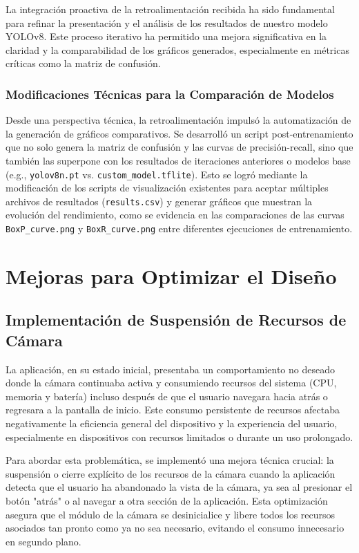 \documentclass[10pt,a4paper]{report}
\begin{document}
La integración proactiva de la retroalimentación recibida ha sido fundamental para refinar la presentación y el análisis de los resultados de nuestro modelo YOLOv8. Este proceso iterativo ha permitido una mejora significativa en la claridad y la comparabilidad de los gráficos generados, especialmente en métricas críticas como la matriz de confusión.



\subsection{Modificaciones Técnicas para la Comparación de Modelos}
Desde una perspectiva técnica, la retroalimentación impulsó la automatización de la generación de gráficos comparativos. Se desarrolló un script post-entrenamiento que no solo genera la matriz de confusión y las curvas de precisión-recall, sino que también las superpone con los resultados de iteraciones anteriores o modelos base (e.g., \texttt{yolov8n.pt} vs. \texttt{custom\_model.tflite}). Esto se logró mediante la modificación de los scripts de visualización existentes para aceptar múltiples archivos de resultados (\texttt{results.csv}) y generar gráficos que muestran la evolución del rendimiento, como se evidencia en las comparaciones de las curvas \texttt{BoxP\_curve.png} y \texttt{BoxR\_curve.png} entre diferentes ejecuciones de entrenamiento.




\chapter{Mejoras para Optimizar el Diseño}

\section{Implementación de Suspensión de Recursos de Cámara}
La aplicación, en su estado inicial, presentaba un comportamiento no deseado donde la cámara continuaba activa y consumiendo recursos del sistema (CPU, memoria y batería) incluso después de que el usuario navegara hacia atrás o regresara a la pantalla de inicio. Este consumo persistente de recursos afectaba negativamente la eficiencia general del dispositivo y la experiencia del usuario, especialmente en dispositivos con recursos limitados o durante un uso prolongado.

Para abordar esta problemática, se implementó una mejora técnica crucial: la suspensión o cierre explícito de los recursos de la cámara cuando la aplicación detecta que el usuario ha abandonado la vista de la cámara, ya sea al presionar el botón "atrás" o al navegar a otra sección de la aplicación. Esta optimización asegura que el módulo de la cámara se desinicialice y libere todos los recursos asociados tan pronto como ya no sea necesario, evitando el consumo innecesario en segundo plano.
\end{document}
